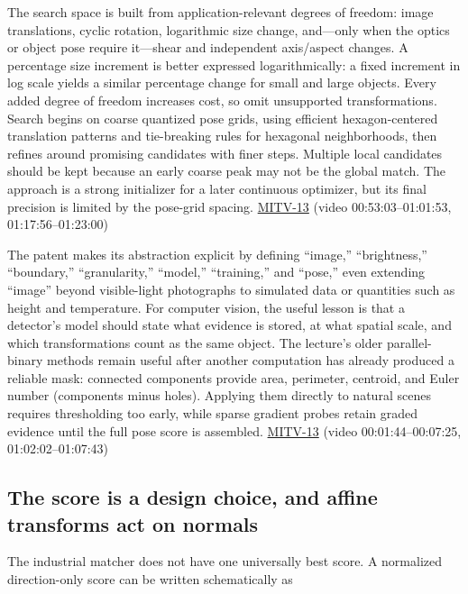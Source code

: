 The search space is built from application-relevant degrees of freedom: image translations, cyclic rotation, logarithmic size change, and---only when the optics or object pose require it---shear and independent axis/aspect changes. A percentage size increment is better expressed logarithmically: a fixed increment in log scale yields a similar percentage change for small and large objects. Every added degree of freedom increases cost, so omit unsupported transformations. Search begins on coarse quantized pose grids, using efficient hexagon-centered translation patterns and tie-breaking rules for hexagonal neighborhoods, then refines around promising candidates with finer steps. Multiple local candidates should be kept because an early coarse peak may not be the global match. The approach is a strong initializer for a later continuous optimizer, but its final precision is limited by the pose-grid spacing. \hyperref[04-visual-computing-ii-ch036-mitv-13---object-detection-recognition-and-pose-determination-patquick-us-7016539]{MITV-13} (video 00:53:03--01:01:53, 01:17:56--01:23:00)

The patent makes its abstraction explicit by defining ``image,'' ``brightness,'' ``boundary,'' ``granularity,'' ``model,'' ``training,'' and ``pose,'' even extending ``image'' beyond visible-light photographs to simulated data or quantities such as height and temperature. For computer vision, the useful lesson is that a detector's model should state what evidence is stored, at what spatial scale, and which transformations count as the same object. The lecture's older parallel-binary methods remain useful after another computation has already produced a reliable mask: connected components provide area, perimeter, centroid, and Euler number (components minus holes). Applying them directly to natural scenes requires thresholding too early, while sparse gradient probes retain graded evidence until the full pose score is assembled. \hyperref[04-visual-computing-ii-ch036-mitv-13---object-detection-recognition-and-pose-determination-patquick-us-7016539]{MITV-13} (video 00:01:44--00:07:25, 01:02:02--01:07:43)

\subsection{The score is a design choice, and affine transforms act on normals}\label{04-visual-computing-ii-ch030-the-score-is-a-design-choice-and-affine-transforms-act-on-normals}

The industrial matcher does not have one universally best score. A normalized direction-only score can be written schematically as


